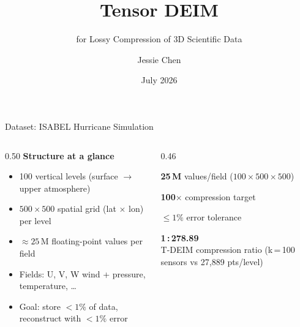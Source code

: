 \documentclass[aspectratio=169, 11pt]{beamer}
\title{Tensor DEIM}
\subtitle{for Lossy Compression of 3D Scientific Data}
\author{Jessie Chen}
\institute{Argonne National Laboratory}
\date{July 2026}
\begin{document}

\maketitle

\begin{frame}{Dataset: ISABEL Hurricane Simulation}
\begin{columns}[T]

\begin{column}{0.50\textwidth}
  \textcolor{cteal}{\textbf{Structure at a glance}}
  \begin{itemize}\setlength\itemsep{0.3em}\small
    \item 100 vertical levels (surface $\to$ upper atmosphere)
    \item $500 \times 500$ spatial grid (lat $\times$ lon) per level
    \item $\approx 25$\,M floating-point values per field
    \item Fields: U, V, W wind + pressure, temperature, \ldots
    \item Goal: store ${<}1\%$ of data, reconstruct with ${<}1\%$ error
  \end{itemize}
\end{column}

\begin{column}{0.46\textwidth}
  \begin{block}{}
    \textcolor{cteal}{\textbf{25\,M}} \hfill
    \scriptsize values/field \enspace($100\!\times\!500\!\times\!500$)
  \end{block}\vspace{0.12em}
  \begin{block}{}
    \textcolor{cteal}{\textbf{100$\times$}} \hfill
    \scriptsize compression target
  \end{block}\vspace{0.12em}
  \begin{block}{}
    \textcolor{cteal}{\textbf{$\leq 1\%$}} \hfill
    \scriptsize error tolerance
  \end{block}\vspace{0.12em}
  \begin{block}{}
    \textcolor{cteal}{\textbf{1\,:\,278.89}} \\[-0.1em]
    \scriptsize T-DEIM compression ratio
    (k\,=\,100 sensors vs 27{,}889 pts/level)
  \end{block}
\end{column}

\end{columns}
\end{frame}
\end{document}
